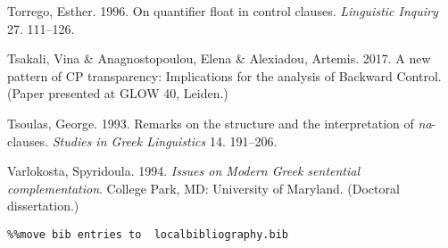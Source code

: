 \documentclass[output=paper]{langsci/langscibook}
\begin{document}
\begin{stylepi}
Torrego, Esther. 1996. On quantifier float in control clauses. \textit{Linguistic Inquiry} 27. 111–126.
\end{stylepi}

Tsakali, Vina \& Anagnostopoulou, Elena \& Alexiadou, Artemis. 2017. A new pattern of CP transparency: Implications for the analysis of Backward Control. (Paper presented at GLOW 40, Leiden.)

\begin{styleNurTexti}
Tsoulas, George. 1993. Remarks on the structure and the interpretation of \textit{na}{}-clauses. \textit{Studies in Greek Linguistics} 14. 191–206.
\end{styleNurTexti}

\begin{styleNormalWeb}
Varlokosta, Spyridoula. 1994. \textit{Issues on Modern Greek sentential complementation}. College Park, MD: University of Maryland. (Doctoral dissertation.)
\end{styleNormalWeb}


\begin{verbatim}%%move bib entries to  localbibliography.bib
\end{verbatim} 

{\sloppy
\printbibliography[heading=subbibliography,notkeyword=this]
}
\end{document}
